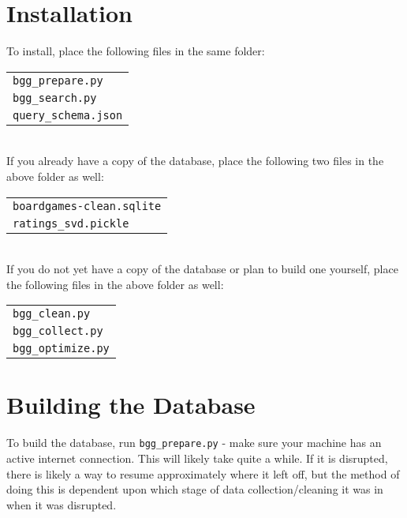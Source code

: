 \documentclass{article}
\newcommand{\code}[1]{\texttt{#1}}
\newcommand{\skipline}[1][1]{\vspace*{#1\baselineskip}}
\begin{document}
\section{Installation}
\noindent To install, place the following files in the same folder:\\
\-\qquad\begin{tabular}{l}
\code{bgg\_prepare.py}\\
\code{bgg\_search.py}\\
\code{query\_schema.json}
\end{tabular}\skipline[.75]\\
If you already have a copy of the database, place the following two files in the above folder as well:\\
\-\qquad\begin{tabular}{l}
\code{boardgames-clean.sqlite}\\
\code{ratings\_svd.pickle}
\end{tabular}\skipline[.75]\\
If you do not yet have a copy of the database or plan to build one yourself, place the following files in the above folder as well:\\
\-\qquad\begin{tabular}{l}
\code{bgg\_clean.py}\\
\code{bgg\_collect.py}\\
\code{bgg\_optimize.py}
\end{tabular}

\section{Building the Database}
\noindent To build the database, run \code{bgg\_prepare.py} - make sure your machine has an active internet connection. This will likely take quite a while. If it is disrupted, there is likely a way to resume approximately where it left off, but the method of doing this is dependent upon which stage of data collection/cleaning it was in when it was disrupted.
\end{document}
